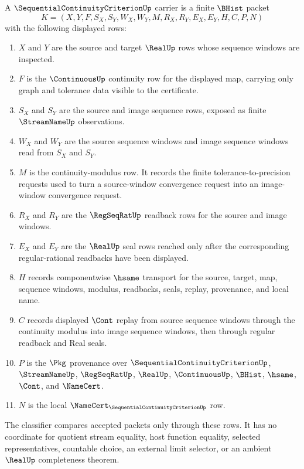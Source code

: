 \begin{definition}
\label{def:sequential-continuity-criterion-carrier}
A $\SequentialContinuityCriterionUp$ carrier is a finite $\BHist$ packet
$$
K=(X,Y,F,S_X,S_Y,W_X,W_Y,M,R_X,R_Y,E_X,E_Y,H,C,P,N)
$$
with the following displayed rows:
\begin{enumerate}
\item $X$ and $Y$ are the source and target $\RealUp$ rows whose sequence windows are inspected.
\item $F$ is the $\ContinuousUp$ continuity row for the displayed map, carrying only graph and tolerance data visible to the certificate.
\item $S_X$ and $S_Y$ are the source and image sequence rows, exposed as finite $\StreamNameUp$ observations.
\item $W_X$ and $W_Y$ are the source sequence windows and image sequence windows read from $S_X$ and $S_Y$.
\item $M$ is the continuity-modulus row. It records the finite tolerance-to-precision requests used to turn a source-window convergence request into an image-window convergence request.
\item $R_X$ and $R_Y$ are the $\RegSeqRatUp$ readback rows for the source and image windows.
\item $E_X$ and $E_Y$ are the $\RealUp$ seal rows reached only after the corresponding regular-rational readbacks have been displayed.
\item $H$ records componentwise $\hsame$ transport for the source, target, map, sequence windows, modulus, readbacks, seals, replay, provenance, and local name.
\item $C$ records displayed $\Cont$ replay from source sequence windows through the continuity modulus into image sequence windows, then through regular readback and Real seals.
\item $P$ is the $\Pkg$ provenance over $\SequentialContinuityCriterionUp$, $\StreamNameUp$, $\RegSeqRatUp$, $\RealUp$, $\ContinuousUp$, $\BHist$, $\hsame$, $\Cont$, and $\NameCert$.
\item $N$ is the local $\NameCert_{\SequentialContinuityCriterionUp}$ row.
\end{enumerate}
The classifier compares accepted packets only through these rows. It has no coordinate for quotient stream equality, host function equality, selected representatives, countable choice, an external limit selector, or an ambient $\RealUp$ completeness theorem.
\end{definition}

